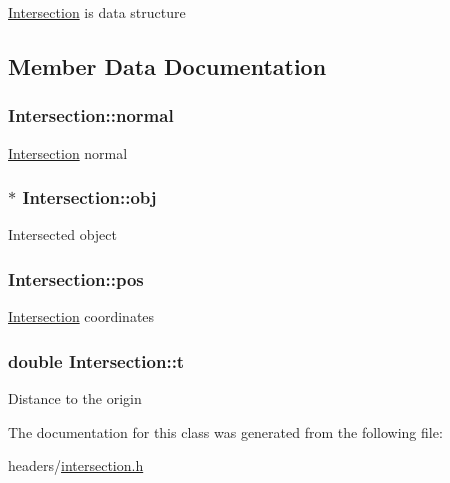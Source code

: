 \hyperlink{class_intersection}{\-Intersection} is data structure 

\subsection{\-Member \-Data \-Documentation}
\hypertarget{class_intersection_aba8efd6d93c445e01f5f91dab79bb37d}{
\subsubsection[{normal}]{ {\bf \-Intersection\-::normal}}}
\label{class_intersection_aba8efd6d93c445e01f5f91dab79bb37d}
\hyperlink{class_intersection}{\-Intersection} normal \hypertarget{class_intersection_ae73304b7b0497012847612c3200f09d5}{
\subsubsection[{obj}]{$\ast$ {\bf \-Intersection\-::obj}}}
\label{class_intersection_ae73304b7b0497012847612c3200f09d5}
\-Intersected object \hypertarget{class_intersection_ade1e9bdd28d83436ea31e55c762ae002}{
\subsubsection[{pos}]{ {\bf \-Intersection\-::pos}}}
\label{class_intersection_ade1e9bdd28d83436ea31e55c762ae002}
\hyperlink{class_intersection}{\-Intersection} coordinates \hypertarget{class_intersection_a033072b1892bec18444dbb580063b00a}{
\subsubsection[{t}]{\setlength{\rightskip}{0pt plus 5cm}double {\bf \-Intersection\-::t}}}
\label{class_intersection_a033072b1892bec18444dbb580063b00a}
\-Distance to the origin 

\-The documentation for this class was generated from the following file\-:\begin{DoxyCompactItemize}
\item 
headers/\hyperlink{intersection_8h}{intersection.\-h}\end{DoxyCompactItemize}
